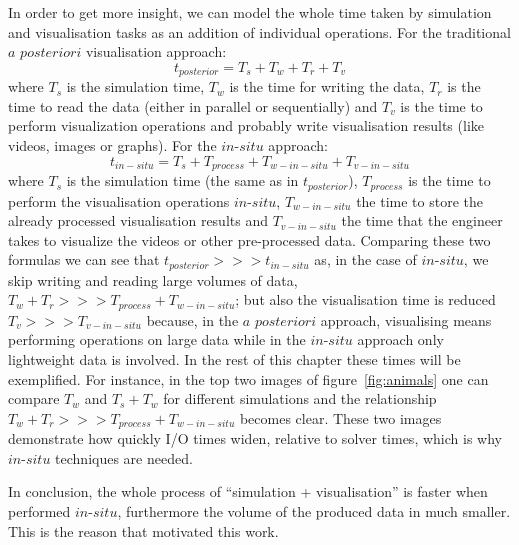 In order to get more insight, we can model the whole time taken by simulation
and visualisation tasks as an addition of individual operations. For the
traditional $a$ $posteriori$ visualisation approach:
\begin{equation}
  t_{posterior} = T_s + T_w  + T_r + T_v
  \label{eq:first}
\end{equation}
where $T_s$ is the simulation time, $T_w$ is the time for writing the data,
$T_r$ is the time to read the data (either in parallel or sequentially) and $T_v$
is the time to perform visualization operations and probably write visualisation
results (like videos, images or graphs). For the $in$-$situ$ approach:
\begin{equation}
t_{in-situ} = T_s + T_{process} + T_{w-in-situ} + T_{v-in-situ}
  \label{eq:second}
\end{equation}
where $T_s$ is the simulation time (the same as in $t_{posterior}$),
$T_{process}$
is the time to perform the visualisation operations $in$-$situ$, $T_{w-in-situ}$
the time to store the already processed visualisation results and
$T_{v-in-situ}$ the time that the engineer takes to visualize the videos or
other pre-processed data. Comparing these two formulas we can see that
$t_{posterior} >>> t_{in-situ}$ as, in the case of $in$-$situ$, we skip writing and reading large volumes
of data, $T_w  + T_r >>> T_{process} + T_{w-in-situ}$; but also the
visualisation time is reduced $T_v >>> T_{v-in-situ}$ because, in the $a$ 
$posteriori$ approach, visualising means performing operations on large data
while in the $in$-$situ$ approach only lightweight data is involved. In the rest
of this chapter these times will be exemplified. For instance, in the top two
images of figure~\ref{fig:animals} one can compare $T_w$ and $T_s + T_w$ for different
simulations and the relationship $T_w  + T_r >>> T_{process} + T_{w-in-situ}$
becomes clear. These two images demonstrate how quickly I/O times widen,
relative to solver times, which is why $in$-$situ$ techniques are needed.

In conclusion, the whole process of ``simulation + visualisation'' is faster when
performed $in$-$situ$, furthermore the volume of the produced data in much
smaller. This is the reason that motivated this work.




